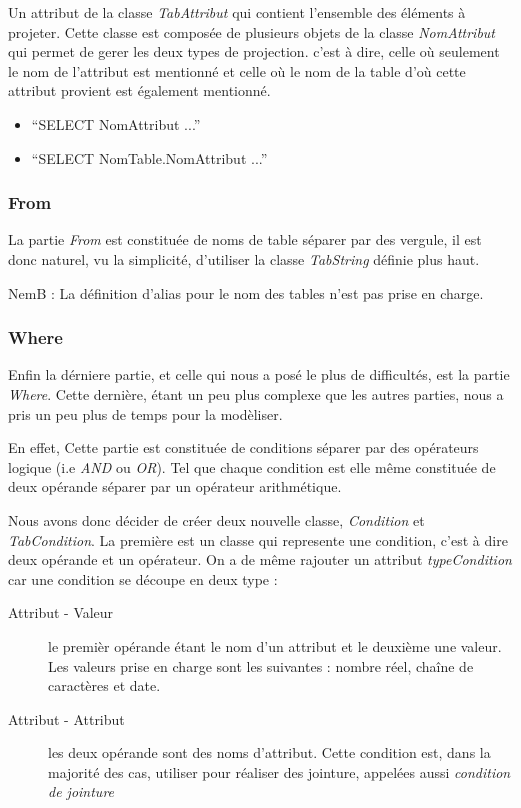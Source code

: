 \documentclass[oneside,13pt,a4paper]{report}
\newcommand\nb[1][0.3]{N\kern-#1emB : }
\begin{document}
Un attribut de la classe \textit{TabAttribut} qui contient l'ensemble des éléments à projeter. Cette classe est composée de plusieurs objets de la classe \textit{NomAttribut} qui permet de gerer les deux types de projection.
c'est à dire, celle où seulement le nom de l'attribut est mentionné et celle où le nom de la table d'où cette attribut provient est également mentionné.
\begin{itemize}
	\item \enquote{SELECT NomAttribut ...}
	\item \enquote{SELECT NomTable.NomAttribut ...}
\end{itemize}

\subsubsection{From}

La partie \textit{From} est constituée de noms de table séparer par des vergule, il est donc naturel, vu la simplicité, d'utiliser la classe \textit{TabString} définie plus haut.

\nb La définition d'alias pour le nom des tables n'est pas prise en charge.

\subsubsection{Where}

Enfin la dérniere partie, et celle qui nous a posé le plus de difficultés, est la partie \textit{Where}. Cette dernière, étant un peu plus complexe que les autres parties, nous a pris un peu plus de temps pour la modèliser.

En effet, Cette partie est constituée de conditions séparer par des opérateurs logique (i.e \textit{AND} ou \textit{OR}). Tel que chaque condition est elle même constituée de deux opérande séparer par un opérateur arithmétique.

Nous avons donc décider de créer deux nouvelle classe, \textit{Condition} et \textit{TabCondition}. La première est un classe qui represente une condition, c'est à dire deux opérande et un opérateur. On a de même rajouter un attribut \textit{typeCondition} car une condition se découpe en deux type :
\begin{description}
	\item[Attribut - Valeur] le premièr opérande étant le nom d'un attribut et le deuxième une valeur. Les valeurs prise en charge sont les suivantes : nombre réel, chaîne de caractères et date.
	\item[Attribut - Attribut] les deux opérande sont des noms d'attribut. Cette condition est, dans la majorité des cas, utiliser pour réaliser des jointure, appelées aussi \textit{condition de jointure}
\end{description}
\end{document}
